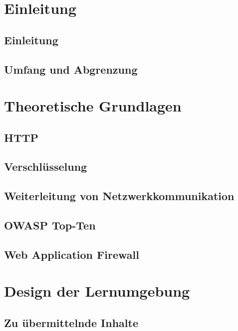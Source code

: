 \documentclass[a4paper, 11pt]{article}
\begin{document}
    
    
    

    \section{Einleitung}
    \subsection{Einleitung}
    
    \subsection{Umfang und Abgrenzung}
    
    \pagebreak

    \section{Theoretische Grundlagen}
    \subsection{HTTP}
    
    \subsection{Verschlüsselung}
    
    \subsection{Weiterleitung von Netzwerkkommunikation}
    
    \subsection{OWASP Top-Ten}
    
    \subsection{Web Application Firewall}
    
    \pagebreak

    \section{Design der Lernumgebung}
    \subsection{Zu übermittelnde Inhalte}
    \label{sec:inhalte}
    
\end{document}
